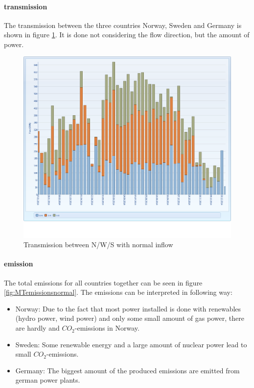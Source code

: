 \documentclass{article}
\begin{document}
\paragraph{transmission\\}
The transmission between the three countries Norway, Sweden and Germany is shown in figure \ref{fig:MTnodetransmissionnormal}. It is done not considering the flow direction, but the amount of power.
\begin{figure}[htbp]
\begin{center}
\includegraphics[width=14cm,keepaspectratio=true]{figures/MTnodetransmission}
\caption{Transmission between N/W/S with normal inflow}
\label{fig:MTnodetransmissionnormal}
\end{center}
\end{figure}
\paragraph{emission\\}
The total emissions for all countries together can be seen in figure \ref{fig:MTemissionsnormal}. The emissions can be interpreted in following way:
\begin{itemize}
\item Norway: Due to the fact that most power installed is done with renewables (hydro power, wind power) and only some small amount of gas power, there are hardly and $CO_2$-emissions in Norway.
\item Sweden: Some renewable energy and a large amount of nuclear power lead to small $CO_2$-emissions. 
\item Germany: The biggest amount of the produced emissions are emitted from german power plants. 
\end{itemize}
\end{document}
